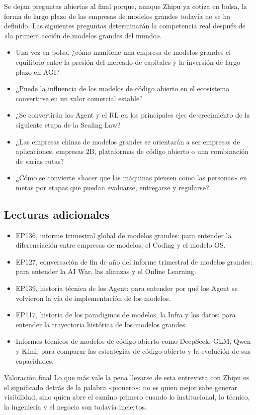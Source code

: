 Se dejan preguntas abiertas al final porque, aunque Zhipu ya cotiza en bolsa, la forma de largo plazo de las empresas de modelos grandes todavía no se ha definido. Las siguientes preguntas determinarán la competencia real después de «la primera acción de modelos grandes del mundo».

\begin{itemize}
\item Una vez en bolsa, ¿cómo mantiene una empresa de modelos grandes el equilibrio entre la presión del mercado de capitales y la inversión de largo plazo en AGI?
\item ¿Puede la influencia de los modelos de código abierto en el ecosistema convertirse en un valor comercial estable?
\item ¿Se convertirán los Agent y el RL en los principales ejes de crecimiento de la siguiente etapa de la Scaling Law?
\item ¿Las empresas chinas de modelos grandes se orientarán a ser empresas de aplicaciones, empresas 2B, plataformas de código abierto o una combinación de varias rutas?
\item ¿Cómo se convierte «hacer que las máquinas piensen como las personas» en metas por etapas que puedan evaluarse, entregarse y regularse?
\end{itemize}

\subsection{Lecturas adicionales}

\begin{itemize}
\item EP136, informe trimestral global de modelos grandes: para entender la diferenciación entre empresas de modelos, el Coding y el modelo OS.
\item EP127, conversación de fin de año del informe trimestral de modelos grandes: para entender la AI War, las alianzas y el Online Learning.
\item EP139, historia técnica de los Agent: para entender por qué los Agent se volvieron la vía de implementación de los modelos.
\item EP117, historia de los paradigmas de modelos, la Infra y los datos: para entender la trayectoria histórica de los modelos grandes.
\item Informes técnicos de modelos de código abierto como DeepSeek, GLM, Qwen y Kimi: para comparar las estrategias de código abierto y la evolución de sus capacidades.
\end{itemize}

\begin{importantbox}{Valoración final}
Lo que más vale la pena llevarse de esta entrevista con Zhipu es el significado detrás de la palabra «pionero»: no es quien mejor sabe generar visibilidad, sino quien abre el camino primero cuando lo institucional, lo técnico, la ingeniería y el negocio son todavía inciertos.
\end{importantbox}


